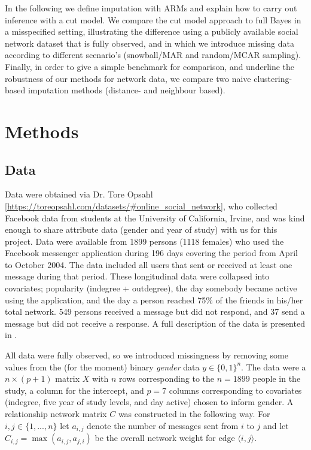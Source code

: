 \documentclass{article}
\def\bra{\langle}\def\ket{\rangle}
\begin{document}
 In the following we define imputation with ARMs and explain how to carry out inference with a cut model. We compare the cut model approach to full Bayes in a misspecified setting,
 illustrating the difference using a publicly available social network dataset that is fully observed, and in which we introduce missing data according to different scenario's (snowball/MAR and random/MCAR sampling). Finally, in order to give a simple benchmark for comparison, and underline the robustness of our methods for network data, we compare two naive clustering-based imputation methods (distance- and neighbour based).


\section{Methods}
\subsection{Data}
Data were obtained via Dr. Tore Opsahl [\url{https://toreopsahl.com/datasets/#online_social_network}], who collected Facebook data from students at the University of California, Irvine, and was kind enough to share attribute data (gender and year of study) with us for this project. Data were available from 1899 persons (1118 females) who used the Facebook messenger application during 196 days covering the period from April to October 2004. The data included all users that sent or received at least one message during that period. These longitudinal data were collapsed into covariates; popularity (indegree + outdegree), the day somebody became active using the application, and the day a person reached 75\% of the friends in his/her total network. 549 persons received a message but did not respond, and 37 send a message but did not receive a response. A full description of the data is presented in \cite{panzarasa2009patterns}.

All data were fully observed, so we introduced missingness by removing some values from the (for the moment) binary \textit{gender} data $y\in \{0,1\}^n$. The data were a $n \times (p+1)$ matrix $X$ with $n$ rows corresponding to the $n=1899$ people in the study, a column for the intercept, and $p=7$ columns corresponding to
covariates (indegree, five year of study levels, and day active) chosen to inform gender.
 A relationship network matrix $C$ was constructed in the following way. For $i,j\in\{1,...,n\}$ let $a_{i,j}$ denote the number of messages sent from $i$ to $j$ and let $C_{i,j}=\max(a_{i,j},a_{j,i})$ be the overall network weight for edge $\bra i,j\ket$.
\end{document}
